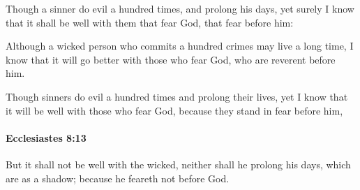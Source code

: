 			\begin{versebox}
					\item[BHS] 
					\item[LXX] 
					\item[ASV] Though a sinner do evil a hundred times, and prolong his days, yet surely I know that it shall be well with them that fear God, that fear before him:
					\item[NIV] Although a wicked person who commits a hundred crimes may live a long time, I know that it will go better with those who fear God, who are reverent before him.
					\item[NRSV] Though sinners do evil a hundred times and prolong their lives, yet I know that it will be well with those who fear God, because they stand in fear before him,
			\end{versebox}

		\paragraph{Ecclesiastes 8:13} %
			\label{ECCLESIASTES-8-13}

			But it shall not be well with the wicked, neither shall he prolong his days, which are as a shadow; because he feareth not before God.

